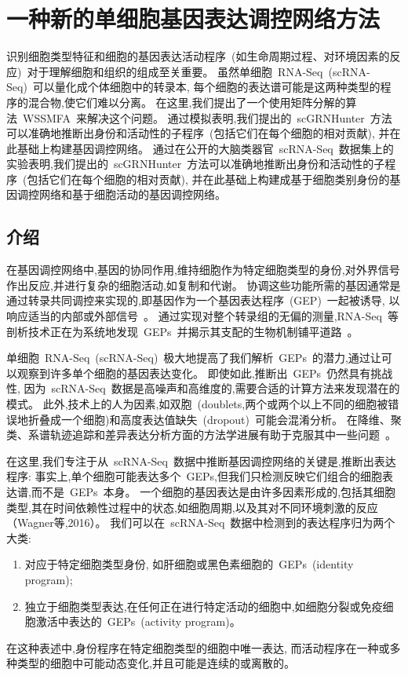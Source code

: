 \section{一种新的单细胞基因表达调控网络方法}

识别细胞类型特征和细胞的基因表达活动程序~(如生命周期过程、对环境因素的反应)~对于理解细胞和组织的组成至关重要。
虽然单细胞~RNA-Seq~(scRNA-Seq)~可以量化成个体细胞中的转录本,
每个细胞的表达谱可能是这两种类型的程序的混合物,使它们难以分离。
在这里,我们提出了一个使用矩阵分解的算法~WSSMFA~来解决这个问题。
通过模拟表明,我们提出的~scGRNHunter~方法可以准确地推断出身份和活动性的子程序~(包括它们在每个细胞的相对贡献), 
并在此基础上构建基因调控网络。
通过在公开的大脑类器官~scRNA-Seq~数据集上的实验表明,我们提出的~scGRNHunter~方法可以准确地推断出身份和活动性的子程序~(包括它们在每个细胞的相对贡献), 
并在此基础上构建成基于细胞类别身份的基因调控网络和基于细胞活动的基因调控网络。

\subsection{介绍}
在基因调控网络中,基因的协同作用,维持细胞作为特定细胞类型的身份,对外界信号作出反应,并进行复杂的细胞活动,如复制和代谢。
协调这些功能所需的基因通常是通过转录共同调控来实现的,即基因作为一个基因表达程序~(GEP)~一起被诱导,
以响应适当的内部或外部信号~\cite{eisen1998cluster,segal2003module}。
通过实现对整个转录组的无偏的测量,RNA-Seq~等剖析技术正在为系统地发现~GEPs~并揭示其支配的生物机制铺平道路~\cite{liberzon2015molecular}。

单细胞~RNA-Seq~(scRNA-Seq)~极大地提高了我们解析~GEPs~的潜力,通过让可以观察到许多单个细胞的基因表达变化。
即使如此,推断出~GEPs~仍然具有挑战性,
因为~scRNA-Seq~数据是高噪声和高维度的,需要合适的计算方法来发现潜在的模式。
此外,技术上的人为因素,如双胞~(doublets,两个或两个以上不同的细胞被错误地折叠成一个细胞)和高度表达值缺失~(dropout)~可能会混淆分析。
在降维、聚类、系谱轨迹追踪和差异表达分析方面的方法学进展有助于克服其中一些问题~\cite{amir2013visne,kharchenko2014bayesian,satija2015spatial,trapnell2014dynamics}。

在这里,我们专注于从~scRNA-Seq~数据中推断基因调控网络的关键是,推断出表达程序:
事实上,单个细胞可能表达多个~GEPs,但我们只检测反映它们组合的细胞表达谱,而不是~GEPs~本身。
一个细胞的基因表达是由许多因素形成的,包括其细胞类型,其在时间依赖性过程中的状态,如细胞周期,以及其对不同环境刺激的反应（Wagner等,2016）。
我们可以在~scRNA-Seq~数据中检测到的表达程序归为两个大类:
\begin{enumerate}
    \item 对应于特定细胞类型身份, 如肝细胞或黑色素细胞的~GEPs~(identity program);
    \item 独立于细胞类型表达,在任何正在进行特定活动的细胞中,如细胞分裂或免疫细胞激活中表达的~GEPs~(activity program)。
\end{enumerate}
在这种表述中,身份程序在特定细胞类型的细胞中唯一表达,
而活动程序在一种或多种类型的细胞中可能动态变化,并且可能是连续的或离散的。

